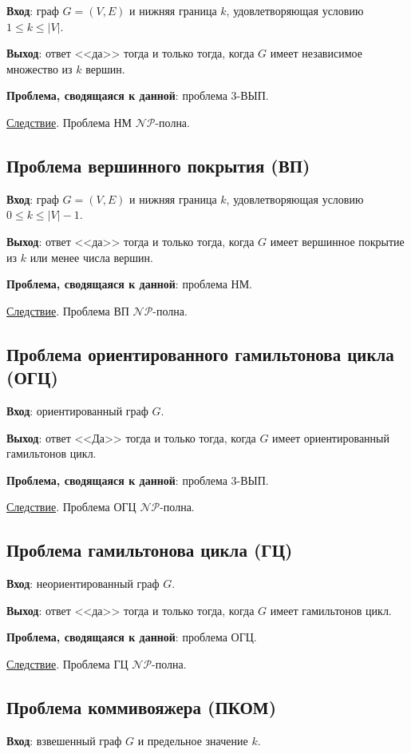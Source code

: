 \textbf{Вход}: граф $G = (V, E)$ и нижняя граница $k$, удовлетворяющая условию $1 \leq k \leq |V|$.

\textbf{Выход}: ответ <<да>> тогда и только тогда, когда $G$ имеет независимое множество из $k$ вершин.

\textbf{Проблема, сводящаяся к данной}: проблема 3-ВЫП.

\underline{Следствие}. Проблема НМ $\mathscr{NP}$-полна.

\subsection{Проблема вершинного покрытия (ВП)}
\textbf{Вход}: граф $G = (V, E)$ и нижняя граница $k$, удовлетворяющая условию $0 \leq k \leq |V| - 1$.

\textbf{Выход}: ответ <<да>> тогда и только тогда, когда $G$ имеет вершинное покрытие из $k$ или менее числа вершин.

\textbf{Проблема, сводящаяся к данной}: проблема НМ.

\underline{Следствие}. Проблема ВП $\mathscr{NP}$-полна.

\subsection{Проблема ориентированного гамильтонова цикла (ОГЦ)}
\textbf{Вход}: ориентированный граф $G$.

\textbf{Выход}: ответ <<Да>> тогда и только тогда, когда $G$ имеет ориентированный гамильтонов цикл.

\textbf{Проблема, сводящаяся к данной}: проблема 3-ВЫП.

\underline{Следствие}. Проблема ОГЦ $\mathscr{NP}$-полна.

\subsection{Проблема гамильтонова цикла (ГЦ)}
\textbf{Вход}: неориентированный граф $G$.

\textbf{Выход}: ответ <<да>> тогда и только тогда, когда $G$ имеет гамильтонов цикл.

\textbf{Проблема, сводящаяся к данной}: проблема ОГЦ.

\underline{Следствие}. Проблема ГЦ $\mathscr{NP}$-полна.

\subsection{Проблема коммивояжера (ПКОМ)}
\textbf{Вход}: взвешенный граф $G$ и предельное значение $k$.

